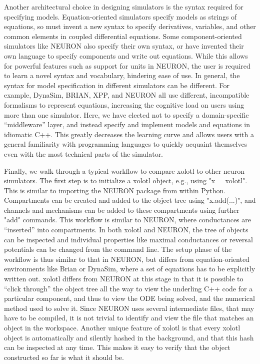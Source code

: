 \documentclass{frontiersSCNS} %
\begin{document}
Another architectural choice in designing simulators is the syntax required for specifying models. Equation-oriented simulators specify models as strings of equations, so must invent a new syntax to specify derivatives, variables, and other common elements in coupled differential equations. Some component-oriented simulators like NEURON also specify their own syntax, or have invented their own language to specify components and write out equations. While this allows for powerful features such as support for units in NEURON, the user is required to learn a novel syntax and vocabulary, hindering ease of use. In general, the syntax for model specification in different simulators can be different. For example, DynaSim, BRIAN, XPP, and NEURON all use different, incompatible formalisms to represent equations, increasing the cognitive load on users using more than one simulator. Here, we have elected not to specify a domain-specific ``middleware'' layer, and instead specify and implement models and equations in idiomatic C++. This greatly decreases the learning curve and allows users with a general familiarity with programming languages to quickly acquaint themselves even with the most technical parts of the simulator.

\begin{tcolorbox}[breakable,notitle,boxrule=0pt,colback=yellow,colframe=yellow]
Finally, we walk through a typical workflow to compare xolotl to other neuron simulators. The first step is to initialize a xolotl object, e.g., using "x = xolotl". This is similar to importing the NEURON package from within Python. Compartments can be created and added to the object tree using "x.add(...)", and channels and mechanisms can be added to these compartments using further "add" commands. This workflow is similar to NEURON, where conductances are ``inserted'' into compartments. In both xolotl and NEURON, the tree of objects can be inspected and individual properties like maximal conductances or reversal potentials can be changed from the command line. The setup phase of the workflow is thus similar to that in NEURON, but differs from equation-oriented environments like Brian or DynaSim, where a set of equations has to be explicitly written out. xolotl differs from NEURON at this stage in that it is possible to ``click through'' the object tree all the way to view the underling C++ code for a particular component, and thus to view the ODE being solved, and the numerical method used to solve it. Since NEURON uses several intermediate files, that may have to be compiled, it is not trivial to identify and view the file that matches an object in the workspace. Another unique feature of xolotl is that every xolotl object is automatically and silently hashed in the background, and that this hash can be inspected at any time. This makes it easy to verify that the object constructed so far is what it should be.
\end{tcolorbox}
\end{document}
